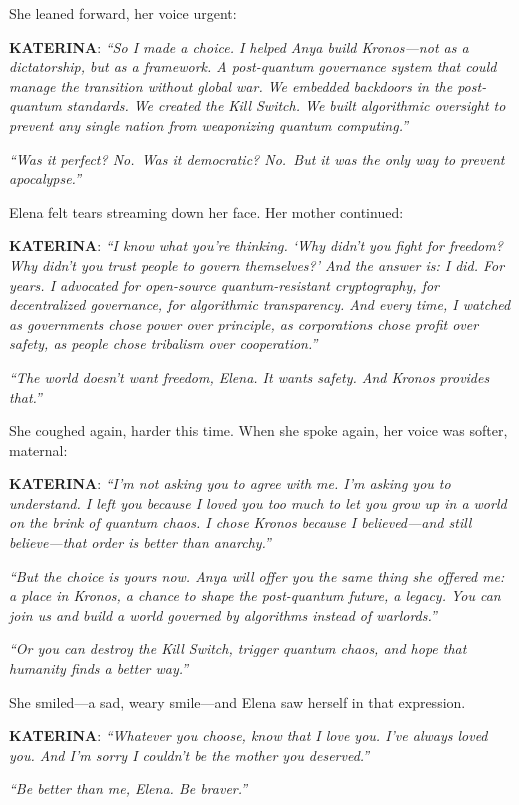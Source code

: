 \documentclass[12pt,letterpaper]{book}
\begin{document}
She leaned forward, her voice urgent:

\textbf{KATERINA}: \emph{``So I made a choice. I helped Anya build Kronos---not as a dictatorship, but as a framework. A post-quantum governance system that could manage the transition without global war. We embedded backdoors in the post-quantum standards. We created the Kill Switch. We built algorithmic oversight to prevent any single nation from weaponizing quantum computing.''}

\emph{``Was it perfect? No.~Was it democratic? No.~But it was the only way to prevent apocalypse.''}

Elena felt tears streaming down her face. Her mother continued:

\textbf{KATERINA}: \emph{``I know what you're thinking. `Why didn't you fight for freedom? Why didn't you trust people to govern themselves?' And the answer is: I did. For years. I advocated for open-source quantum-resistant cryptography, for decentralized governance, for algorithmic transparency. And every time, I watched as governments chose power over principle, as corporations chose profit over safety, as people chose tribalism over cooperation.''}

\emph{``The world doesn't want freedom, Elena. It wants safety. And Kronos provides that.''}

She coughed again, harder this time. When she spoke again, her voice was softer, maternal:

\textbf{KATERINA}: \emph{``I'm not asking you to agree with me. I'm asking you to understand. I left you because I loved you too much to let you grow up in a world on the brink of quantum chaos. I chose Kronos because I believed---and still believe---that order is better than anarchy.''}

\emph{``But the choice is yours now. Anya will offer you the same thing she offered me: a place in Kronos, a chance to shape the post-quantum future, a legacy. You can join us and build a world governed by algorithms instead of warlords.''}

\emph{``Or you can destroy the Kill Switch, trigger quantum chaos, and hope that humanity finds a better way.''}

She smiled---a sad, weary smile---and Elena saw herself in that expression.

\textbf{KATERINA}: \emph{``Whatever you choose, know that I love you. I've always loved you. And I'm sorry I couldn't be the mother you deserved.''}

\emph{``Be better than me, Elena. Be braver.''}
\end{document}
